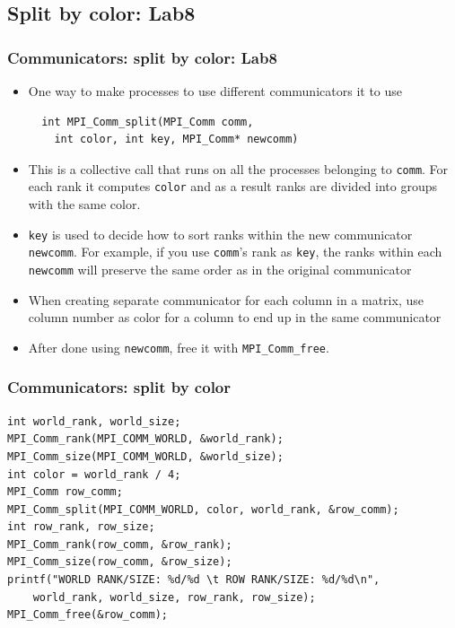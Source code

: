 \documentclass{beamer}
\begin{document}
\subsection{Split by color: Lab8}
\begin{frame}[fragile]
  \frametitle{Communicators: split by color: Lab8}
\begin{itemize}
\item One way to make processes to use different communicators it to use
{\color{mycolorcode}
\begin{verbatim}
  int MPI_Comm_split(MPI_Comm comm,
    int color, int key, MPI_Comm* newcomm)
\end{verbatim}
}
\item This is a collective call that runs on all the processes belonging to {\color{mycolorcode}\verb|comm|}. For each rank it computes {\color{mycolorcode}\verb|color|} and as a result ranks are divided into groups with the same color.
\item \verb|key| is used to decide how to sort ranks within the new communicator {\color{mycolorcode}\verb|newcomm|}. For example, if you use {\color{mycolorcode}\verb|comm|}'s rank as {\color{mycolorcode}\verb|key|}, 
the ranks within each {\color{mycolorcode}\verb|newcomm|} will preserve the same order as in the
original communicator
\item When creating separate communicator for each column in a matrix, use column number as color for a column to end up in the same communicator
\item After done using {\color{mycolorcode}\verb|newcomm|}, free it with {\color{mycolorcode}\verb|MPI_Comm_free|}.
\end{itemize}
\end{frame}

\begin{frame}[fragile]
  \frametitle{Communicators: split by color}
{\color{mycolorcode}
\begin{verbatim}
int world_rank, world_size;
MPI_Comm_rank(MPI_COMM_WORLD, &world_rank);
MPI_Comm_size(MPI_COMM_WORLD, &world_size);
int color = world_rank / 4; 
MPI_Comm row_comm;
MPI_Comm_split(MPI_COMM_WORLD, color, world_rank, &row_comm);
int row_rank, row_size;
MPI_Comm_rank(row_comm, &row_rank);
MPI_Comm_size(row_comm, &row_size);
printf("WORLD RANK/SIZE: %d/%d \t ROW RANK/SIZE: %d/%d\n",
	world_rank, world_size, row_rank, row_size);
MPI_Comm_free(&row_comm);
\end{verbatim}
}
\end{frame}
\end{document}
